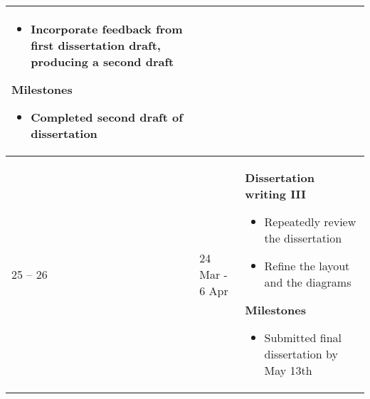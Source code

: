 \documentclass[../dissertation/diss.tex]{subfiles}
\begin{document}
\begin{longtable}{m{40pt}m{75pt}m{265pt}}
\begin{itemize}
        \item Incorporate feedback from first dissertation draft, producing a second draft
    \end{itemize}
    \textbf{Milestones}
    \begin{itemize}
        \item Completed second draft of dissertation
    \end{itemize} \\
    \hline
    25 -- 26 & 24 Mar - 6 Apr & %
    \textbf{Dissertation writing III}
    \begin{itemize}
        \item Repeatedly review the dissertation
        \item Refine the layout and the diagrams
    \end{itemize}
    \textbf{Milestones}
    \begin{itemize}
        \item Submitted final dissertation by May 13th
    \end{itemize} \\
    \hline
\end{longtable}





\end{document}
